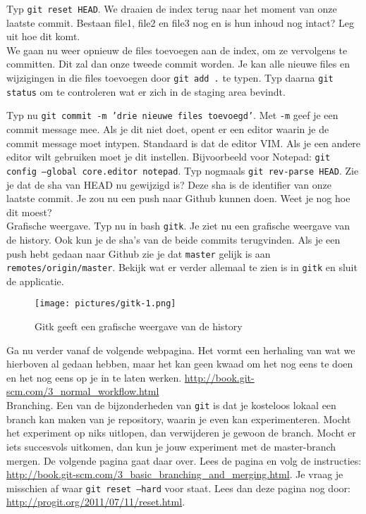 \step Typ {\tt git reset HEAD}. We draaien de index terug naar het
moment van onze laatste commit. Bestaan file1, file2 en file3 nog en
is hun inhoud nog intact? Leg uit hoe dit komt. \\

\step We gaan nu weer opnieuw de files toevoegen aan de index, om ze
vervolgens te committen. Dit zal dan onze tweede commit worden. Je kan
alle nieuwe files en wijzigingen in die files toevoegen door {\tt git
  add .} te typen. Typ daarna {\tt git status} om te controleren wat
er zich in de staging area bevindt.

\step Typ nu {\tt git commit -m 'drie nieuwe files toevoegd'}. Met
{\tt -m} geef je een commit message mee. Als je dit niet doet, opent
er een editor waarin je de commit message moet intypen. Standaard
is dat de editor VIM. Als je een andere editor wilt gebruiken moet je
dit instellen. Bijvoorbeeld voor Notepad: {\tt git config
  --global core.editor notepad}. Typ
nogmaals {\tt git rev-parse HEAD}. Zie je dat de sha van HEAD nu
gewijzigd is? Deze sha is de identifier van onze laatste commit. 
Je zou nu een push naar Github kunnen doen. Weet je nog hoe dit moest? \\

\step Grafische weergave. Typ nu in bash {\tt gitk}. Je ziet
nu een grafische weergave van de history. Ook kun je de sha's van de
beide commits terugvinden. Als je een push hebt gedaan naar Github zie
je dat {\tt master} gelijk is aan {\tt remotes/origin/master}. Bekijk
wat er verder allemaal te zien is in {\tt gitk} en sluit de
applicatie. \\ 

\begin{figure} 
\begin{center}
  \caption{Gitk geeft een grafische weergave van de history}
  \texttt{[image: pictures/gitk-1.png]}
  \label{fig:gitk-1}
\end{center}
\end{figure}

\step Ga nu verder vanaf de volgende webpagina. Het vormt een herhaling
van wat we hierboven al gedaan hebben, maar het kan geen kwaad om het
nog eens te doen en het nog eens op je in te laten werken.
\url{http://book.git-scm.com/3_normal_workflow.html} \\

\step Branching. Een van de bijzonderheden van {\tt git} is dat je
kosteloos lokaal een branch kan maken van je repository, waarin je
even kan experimenteren. Mocht het experiment op niks uitlopen, dan
verwijderen je gewoon de branch. Mocht er iets succesvols uitkomen,
dan kun je jouw experiment met de master-branch mergen. 
De volgende pagina gaat daar over. Lees de
pagina en volg de instructies:
\url{http://book.git-scm.com/3_basic_branching_and_merging.html}. Je
vraag je misschien af waar {\tt git reset --hard} voor staat. Lees dan
deze pagina nog door: \url{http://progit.org/2011/07/11/reset.html}. \\

